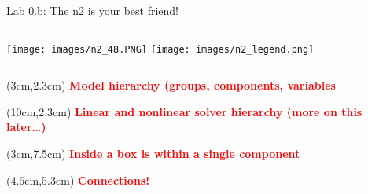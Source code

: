 \documentclass[aspectratio=169, usenames,dvipsnames, 14pt]{beamer}
\begin{document}
\begin{frame}{Lab 0.b: The n2 is your best friend!}
    \vspace{1cm}     %
    
    \begin{columns}
            \texttt{[image: images/n2\_48.PNG]}  %
            \hspace{-2cm}
            \texttt{[image: images/n2\_legend.png]}
    \end{columns}
    
    \begin{textblock*}{4.25cm}(3cm,2.3cm)
        \footnotesize \textcolor{red}{\textbf{Model hierarchy (groups, components, variables}}
    \end{textblock*}
    
    \begin{textblock*}{4cm}(10cm,2.3cm)
      \footnotesize \textcolor{red}{\textbf{Linear and nonlinear solver hierarchy (more on this later…)}}
    \end{textblock*}
        
    \begin{textblock*}{3cm}(3cm,7.5cm)
      \footnotesize \textcolor{red}{\textbf{Inside a box is within a single component}}
    \end{textblock*}
    
    \begin{textblock*}{4cm}(4.6cm,5.3cm)
        \footnotesize \textcolor{red}{\textbf{Connections!}}        %
    \end{textblock*}
    
    


\end{frame}

\end{document}
